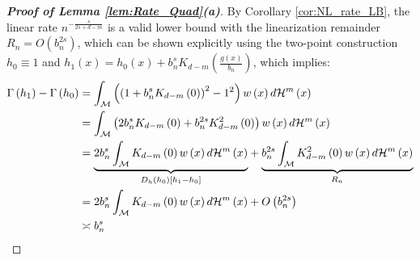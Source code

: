 \documentclass[12pt,american]{article}
\theoremstyle{definition}
\theoremstyle{plain}
\theoremstyle{definition}
\theoremstyle{plain}
\theoremstyle{plain}
\theoremstyle{plain}
\theoremstyle{plain}
\theoremstyle{plain}
\begin{document}
\begin{proof}[\textbf{Proof of Lemma \ref{lem:Rate_Quad}(a)}]
By Corollary \ref{cor:NL_rate_LB}, the linear rate $n^{-\frac{s}{2s+d-m}}$ is a valid
lower bound with the linearization remainder $R_{n}=O\left(b_{n}^{2s}\right)$, which can be shown explicitly using the two-point construction
$h_{0}\equiv1$ and $h_{1}(x)=h_{0}(x)+b_{n}^{s}K_{d-m}\left(\frac{g\left(x\right)}{b_{n}}\right)$, which implies:
\begin{align*}
\Gamma\left(h_{1}\right)-\Gamma\left(h_{0}\right) & =\int_{{\cal M}}\left(\left(1+b_{n}^{s}K_{d-m}\left(0\right)\right)^{2}-1^{2}\right)w\left(x\right)d{\cal H}^{m}\left(x\right)\\
 & =\int_{{\cal M}}\left(2b_{n}^{s}K_{d-m}\left(0\right)+b_{n}^{2s}K_{d-m}^{2}\left(0\right)\right)w\left(x\right)d{\cal H}^{m}\left(x\right)\\
 & =\underset{D_{h}\left(h_{0}\right)\left[h_{1}-h_{0}\right]}{\underbrace{2b_{n}^{s}\int_{{\cal M}}K_{d-m}\left(0\right)w\left(x\right)d{\cal H}^{m}\left(x\right)}}+\underset{R_{n}}{\underbrace{b_{n}^{2s}\int_{{\cal M}}K_{d-m}^{2}\left(0\right)w\left(x\right)d{\cal H}^{m}\left(x\right)}}\\
 & =2b_{n}^{s}\int_{{\cal M}}K_{d-m}\left(0\right)w\left(x\right)d{\cal H}^{m}\left(x\right)+O\left(b_{n}^{2s}\right)\\
 & \asymp b_{n}^{s}
\end{align*}


\end{proof}
\end{document}

